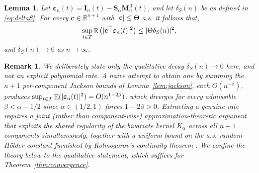\documentclass[11pt, a4paper]{article}
\theoremstyle{theoremstyle}
\newtheorem{lemma}[theorem]{Lemma}
\theoremstyle{definitionstyle}
\newtheorem{remark}[theorem]{Remark}
\DeclareMathOperator{\EE}{\mathbb E}
\DeclarePairedDelimiter{\abs}{\lvert}{\rvert}
\begin{document}
\begin{lemma}\label{lem:proj_remainder}
    Let $\boldsymbol \varepsilon_n(t) = \mathbf I_n(t) - \mathbf S_\alpha \mathbf M_n^\Lambda(t)$, and let $\delta_S(n)$ be as defined in \eqref{eq:deltaS}. For every $\mathbf c \in \mathbb R^{n+1}$ with $\abs{\mathbf c} \leq \Theta$ a.s. it follows that,
    \begin{equation}
        \sup_{t \in T} \EE \left ( \abs{\mathbf c^\top \boldsymbol \varepsilon_n(t)}^2 \right ) \leq \abs{\Theta \delta_S(n)}^2,
    \end{equation}
    and $\delta_S(n) \to 0$ as $n \to \infty$.
\end{lemma}
\begin{remark}
    We deliberately state only the qualitative decay $\delta_S(n) \to 0$ here, and not an explicit polynomial rate. A naive attempt to obtain one by summing the $n+1$ per-component Jackson bounds of Lemma~\ref{lem:jackson}, each $O(n^{-\beta})$, produces $\sup_{t\in T}\EE(\abs{\boldsymbol\varepsilon_n(t)}^2) = O(n^{1-2\beta})$, which \emph{diverges} for every admissible $\beta<\alpha-1/2$ since $\alpha\in(1/2,1)$ forces $1-2\beta>0$. Extracting a genuine rate requires a joint (rather than component-wise) approximation-theoretic argument that exploits the shared regularity of the bivariate kernel $K_\alpha$ across all $n+1$ components simultaneously, together with a uniform bound on the a.s.-random H\"older constant furnished by Kolmogorov's continuity theorem \cite{DaPratoZabczyk2014}. We confine the theory below to the qualitative statement, which suffices for Theorem~\ref{thm:convergence}.
\end{remark}
\end{document}
